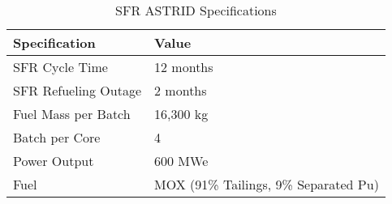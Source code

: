 \begin{table}[h]
	\centering
	\begin{tabularx}{\textwidth}{bb}
		\hline
		Specification & Value \\
		\hline
		SFR Cycle Time & 12 months \\ 
		SFR Refueling Outage & 2 months \\
		Fuel Mass per Batch & 16,300 kg \\
		Batch per Core & 4 \\
		Power Output & 600 MWe \\
		Fuel & {\small \gls{MOX} (91\% Tailings, 9\% Separated Pu)}\\
		\hline
	\end{tabularx}
	\caption {\gls{SFR} ASTRID Specifications}
	\cite{marsaultmarie-sophie_pre-conceptual_2012}
	\label{tab:sfr}
\end{table}

